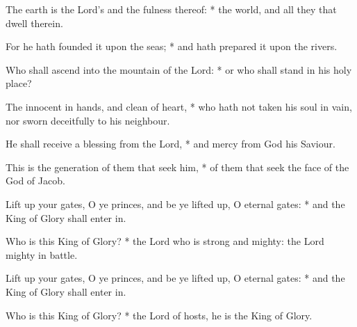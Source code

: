 \begin{enpars}
\item The earth is the Lord’s and the fulness thereof: * the world, and all they that dwell therein.
\item For he hath founded it upon the seas; * and hath prepared it upon the rivers.
\item Who shall ascend into the mountain of the Lord: * or who shall stand in his holy place?
\item The innocent in hands, and clean of heart, * who hath not taken his soul in vain, nor sworn deceitfully to his neighbour.
\item He shall receive a blessing from the Lord, * and mercy from God his Saviour.
\item This is the generation of them that seek him, * of them that seek the face of the God of Jacob.
\item Lift up your gates, O ye princes, and be ye lifted up, O eternal gates: * and the King of Glory shall enter in.
\item Who is this King of Glory? * the Lord who is strong and mighty: the Lord mighty in battle.
\item Lift up your gates, O ye princes, and be ye lifted up, O eternal gates: * and the King of Glory shall enter in.
\item Who is this King of Glory? * the Lord of hosts, he is the King of Glory.
\end{enpars}
